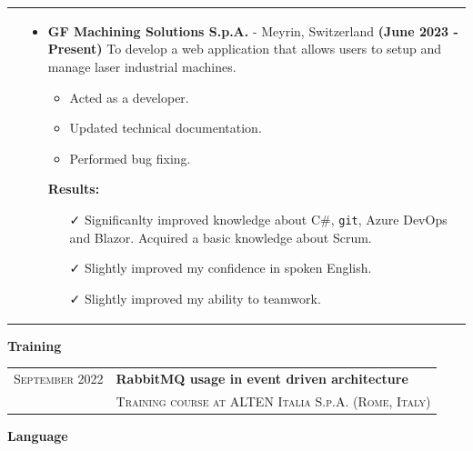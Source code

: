 \documentclass[english,10pt,a4paper]{article}
\newcommand{\CvCheck}{\textcolor{CvColor}{\faCheck}}
\newcommand{\CvSection}[2]{\vspace{0.5cm}
	\begin{tcolorbox}[colback=CvSidebarBackColor,boxrule=0pt, top=2.5pt,bottom=2.5pt, arc=0pt,outer arc=0pt]
	{\Large \textcolor{CvSidebarTextColor}{#1 \hspace{2pt} \textbf{#2}}}
	\end{tcolorbox}
	}
\newcommand{\CvDate}[1]{\textcolor{CvColor}{{\textsc{#1}}}}
\def\SidebarHSize{3.95cm}
\def\BodyHSize{12.5cm}
\begin{document}
\begin{tabular}{p{\SidebarHSize}|p{\BodyHSize}}

& \begin{itemize}
	\item \textbf{GF Machining Solutions S.p.A.} - Meyrin, Switzerland \newline
	\textbf{(June 2023 - Present)} \newline
	To develop a web application that allows users to setup and manage laser industrial machines.
	
	\begin{itemize}
		\item Acted as a developer.
		\item Updated technical documentation.
		\item Performed bug fixing.
	\end{itemize}
	
	\textcolor{CvColor}{\textbf{Results:}}
	\begin{itemize}
		\item[\CvCheck] Significanlty improved knowledge about C\#, \texttt{git}, Azure DevOps and Blazor. Acquired a basic knowledge about Scrum. 
		\item[\CvCheck] Slightly improved my confidence in spoken English.
		\item[\CvCheck] Slightly improved my ability to teamwork.
	\end{itemize}
\end{itemize}

\end{tabular}

		\CvSection{\faBook}{Training}
		
		\begin{tabular}{p{\SidebarHSize}|p{\BodyHSize}}
			\CvDate{September 2022} & \textbf{RabbitMQ usage in event driven architecture} \\
			& \textsc{Training course at ALTEN Italia S.p.A. (Rome, Italy)} \\
		\end{tabular}
		
		\CvSection{\faLanguage}{Language}
		
\end{document}
